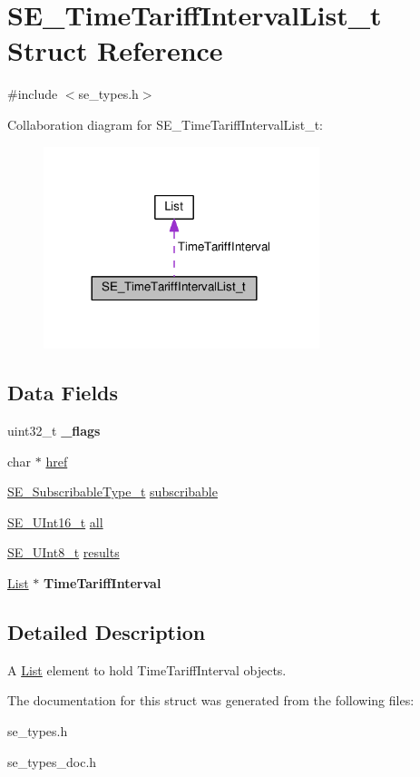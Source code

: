 \hypertarget{structSE__TimeTariffIntervalList__t}{}\section{S\+E\+\_\+\+Time\+Tariff\+Interval\+List\+\_\+t Struct Reference}
\label{structSE__TimeTariffIntervalList__t}


{\ttfamily \#include $<$se\+\_\+types.\+h$>$}



Collaboration diagram for S\+E\+\_\+\+Time\+Tariff\+Interval\+List\+\_\+t\+:\nopagebreak
\begin{figure}[H]
\begin{center}
\leavevmode
\includegraphics[width=228pt]{structSE__TimeTariffIntervalList__t__coll__graph}
\end{center}
\end{figure}
\subsection*{Data Fields}
\begin{DoxyCompactItemize}
\item 
uint32\+\_\+t {\bfseries \+\_\+flags}
\item 
char $\ast$ \hyperlink{group__TimeTariffIntervalList_ga371ed4352ff21e9f24d404ff0e9f81b6}{href}
\item 
\hyperlink{group__SubscribableType_ga5c41f553d369710ed34619266bf2551e}{S\+E\+\_\+\+Subscribable\+Type\+\_\+t} \hyperlink{group__TimeTariffIntervalList_ga1a55fc782a58ffbef307e3bae8f43f6c}{subscribable}
\item 
\hyperlink{group__UInt16_gac68d541f189538bfd30cfaa712d20d29}{S\+E\+\_\+\+U\+Int16\+\_\+t} \hyperlink{group__TimeTariffIntervalList_gaa1a9b18d3c16c9c03f73ec471c048898}{all}
\item 
\hyperlink{group__UInt8_gaf7c365a1acfe204e3a67c16ed44572f5}{S\+E\+\_\+\+U\+Int8\+\_\+t} \hyperlink{group__TimeTariffIntervalList_ga46a856a44a08a8467dc3927024765e11}{results}
\item 
\hyperlink{structList}{List} $\ast$ {\bfseries Time\+Tariff\+Interval}
\end{DoxyCompactItemize}


\subsection{Detailed Description}
A \hyperlink{structList}{List} element to hold Time\+Tariff\+Interval objects. 

The documentation for this struct was generated from the following files\+:\begin{DoxyCompactItemize}
\item 
se\+\_\+types.\+h\item 
se\+\_\+types\+\_\+doc.\+h\end{DoxyCompactItemize}
